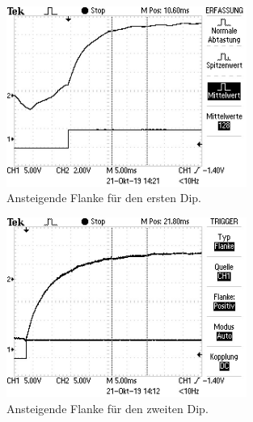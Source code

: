 \begin{equatio*}
\begin{figure}
  \centering
  \includegraphics[width=0.7\textwidth]{data/Dip1.jpg}
  \caption{Ansteigende Flanke für den ersten Dip.}
  \label{fig:flanke1}
\end{figure}
\begin{figure}
  \centering
  \includegraphics[width=0.7\textwidth]{data/Dip2.jpg}
  \caption{Ansteigende Flanke für den zweiten Dip.}
  \label{fig:flanke2}
\end{figure}


\end{equatio*}

